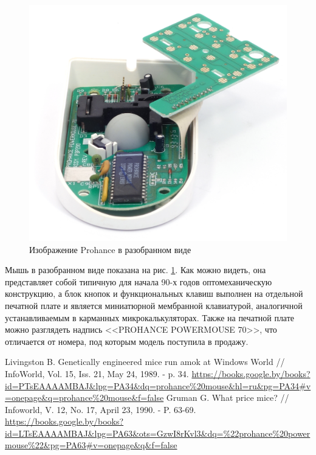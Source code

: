 \documentclass[11pt, a4paper]{article}
\begin{document}
\begin{figure}[h]
    \centering
    \includegraphics[scale=0.8]{1989_prohance_powermouse/inside_60.jpg}
    \caption{Изображение Prohance в разобранном виде}
    \label{fig:ProhanceInside}
\end{figure}

Мышь в разобранном виде показана на рис. \ref{fig:ProhanceInside}. Как можно видеть, она представляет собой типичную для начала 90-х годов оптомеханическую конструкцию, а блок кнопок и функциональных клавиш выполнен на отдельной печатной плате и является миниатюрной мембранной клавиатурой, аналогичной устанавливаемым в карманных микрокалькуляторах. Также на печатной плате можно разглядеть надпись <<PROHANCE POWERMOUSE 70>>, что отличается от номера, под которым модель поступила в продажу.

\begin{thebibliography}{9}
 Livingston B. Genetically engineered mice run amok at Windows World // InfoWorld, Vol. 15, Iss. 21, May 24, 1989. - p. 34. \url{https://books.google.by/books?id=PTsEAAAAMBAJ&lpg=PA34&dq=prohance%20mouse&hl=ru&pg=PA34#v=onepage&q=prohance%20mouse&f=false}
 Gruman G. What price mice? // Infoworld, V. 12, No. 17, April 23, 1990. - P. 63-69. \url{https://books.google.by/books?id=LTsEAAAAMBAJ&lpg=PA63&ots=GzwI8rKvl3&dq=%22prohance%20powermouse%22&pg=PA63#v=onepage&q&f=false}
\end{thebibliography}
\end{document}
